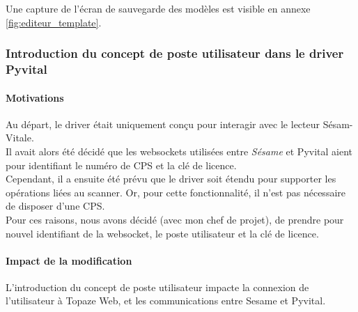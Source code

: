 Une capture de l'écran de sauvegarde des modèles est visible en annexe \ref{fig:editeur_template}.

		
\subsubsection{Introduction du concept de poste utilisateur dans le driver Pyvital}
\paragraph*{Motivations\\}
Au départ, le driver était uniquement conçu pour interagir avec le lecteur Sésam-Vitale.\\ Il avait alors été décidé que les websockets utilisées entre \textit{Sésame} et Pyvital aient pour identifiant le numéro de \gls{CPS} et la clé de licence.\\
Cependant, il a ensuite été prévu que le driver soit étendu pour supporter les opérations liées au scanner. Or, pour cette fonctionnalité, il n'est pas nécessaire de disposer d'une CPS.\\
Pour ces raisons, nous avons décidé (avec mon chef de projet), de prendre pour nouvel identifiant de la websocket, le poste utilisateur et la clé de licence. 

\paragraph*{Impact de la modification\\}
L'introduction du concept de poste utilisateur impacte la connexion de l'utilisateur à Topaze Web, et les communications entre Sesame et Pyvital.\\

